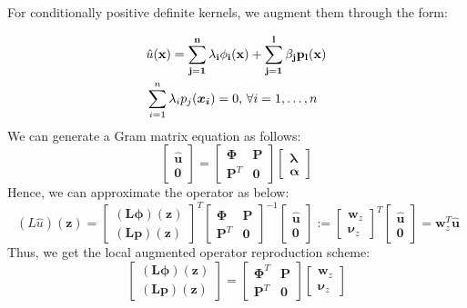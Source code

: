 \documentclass[11pt]{article}
\begin{document}
For conditionally positive definite kernels, we augment them through the form:

\begin{align}
	&\hat{u}(\bf{x}) = \sum_{j=1}^n \lambda_i \phi_i(\bf{x}) + \sum_{j=1}^l \beta_j p_l(\bf{x}) \\	
	&\sum_{i=1}^n \lambda_i p_j(\bm{x_i}) = 0 \text{, } \forall i=1,\hdots,n
\end{align}
We can generate a Gram matrix equation as follows:
\begin{equation*}
	\begin{bmatrix}
		\bm{\hat{u}} \\ \bm{0}
	\end{bmatrix} = 
	\begin{bmatrix}
		\bm{\Phi} & \bm{P} \\
		\bm{P}^T & \bm{0}
	\end{bmatrix}
	\begin{bmatrix}
		\bm{\lambda} \\ \bm{\alpha}
	\end{bmatrix}
\end{equation*}
Hence, we can approximate the operator as below:
\begin{equation}\
	(L\hat{u})(\bm{z}) =
	\begin{bmatrix}
		\bm{(L\phi)(\bm{z})} \\ \bm{(Lp)(\bm{z})}
	\end{bmatrix}^T 
	\begin{bmatrix}
		\bm{\Phi} & \bm{P} \\
		\bm{P}^T & \bm{0}
	\end{bmatrix}^{-1}
	\begin{bmatrix}
		\bm{\hat{u}} \\ \bm{0}
	\end{bmatrix} :=
	\begin{bmatrix}
		\bm{w}_z \\ \bm{\nu}_z
	\end{bmatrix}^T 
	\begin{bmatrix}
		\bm{\hat{u}} \\ \bm{0}
	\end{bmatrix} =
	\bm{w}^T_z \bm{\hat{u}}
	\label{eq:operator_approx}
\end{equation}
Thus, we get the local augmented operator reproduction scheme:
\begin{equation}
	\begin{bmatrix}
		\bm{(L\phi)(\bm{z})} \\ \bm{(Lp)(\bm{z})}
	\end{bmatrix} =
	\begin{bmatrix}
		\bm{\Phi}^T & \bm{P} \\
		\bm{P}^T & \bm{0}
	\end{bmatrix} \begin{bmatrix}
		\bm{w}_z \\ \bm{\nu}_z
	\end{bmatrix}
	\label{eq:weight_solve}
\end{equation}
\end{document}
